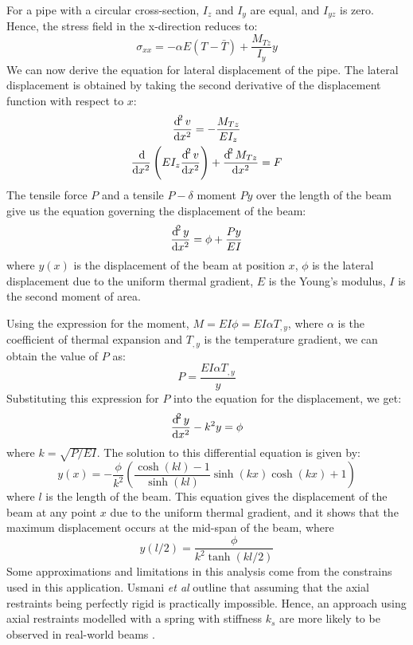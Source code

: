 For a pipe with a circular cross-section, $I_z$ and $I_y$ are equal, and $I_{yz}$ is zero. Hence, the stress field in the x-direction reduces to:
\begin{equation}
    \sigma_{xx} = -\alpha E \left(T - \bar{T}\right) + \frac{M_{Tz}}{I_y}y
\end{equation}
We can now derive the equation for lateral displacement of the pipe. The lateral displacement is obtained by taking the second derivative of the displacement function with respect to $x$:
\begin{gather}
    \frac{\dif^2 v}{\dif x^2} = - \frac{M_{Tz}}{EI_z}\\
    \frac{\dif}{\dif x^2}\left(EI_z\frac{\dif^2 v}{\dif x^2}\right) + \frac{\dif^2 M_{Tz}}{\dif x^2} = F
\end{gather}
The tensile force $P$ and a tensile $P-\delta$ moment $Py$ over the length of the beam give us the equation governing the displacement of the beam:
\begin{equation}
    \frac{\dif^2 y}{\dif x^2} = \phi + \frac{Py}{EI}
\end{equation}
where $y(x)$ is the displacement of the beam at position $x$, $\phi$ is the lateral displacement due to the uniform thermal gradient, $E$ is the Young's modulus, $I$ is the second moment of area.

Using the expression for the moment, $M = EI \phi = EI\alpha T_{,y}$, where $\alpha$ is the coefficient of thermal expansion and $T_{,y}$ is the temperature gradient, we can obtain the value of $P$ as:
\begin{equation}
    P = \frac{EI\alpha T_{,y}}{y}
\end{equation}
Substituting this expression for $P$ into the equation for the displacement, we get:
\begin{equation}
    \frac{\dif^2 y}{\dif x^2} - k^2 y = \phi
\end{equation}
where $k = \sqrt{P/EI}$. The solution to this differential equation is given by:
\begin{equation}
    y(x) = -\frac{\phi}{k^2}\left(\frac{\cosh(kl) - 1}{\sinh(kl)}\sinh(kx)\cosh(kx)+1\right)
\end{equation}
where $l$ is the length of the beam. This equation gives the displacement of the beam at any point $x$ due to the uniform thermal gradient, and it shows that the maximum displacement occurs at the mid-span of the beam, where
\begin{equation}
    y(l/2) = \frac{\phi}{k^2 \tanh(kl/2)}
\end{equation}
Some approximations and limitations in this analysis come from the constrains used in this application. Usmani \textit{et al} outline that assuming that the axial restraints being perfectly rigid is practically impossible. Hence, an approach using axial restraints modelled with a spring with stiffness $k_s$ are more likely to be observed in real-world beams \cite{USMANI2001721}.
